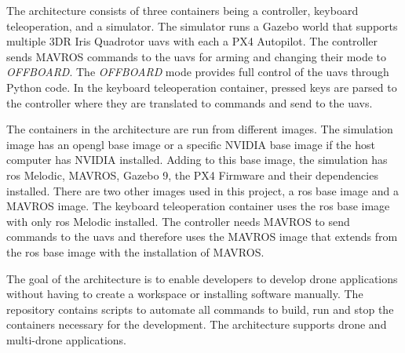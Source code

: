 The architecture consists of three containers being a controller, keyboard teleoperation, and a simulator. The simulator runs a Gazebo world that supports multiple 3DR Iris Quadrotor \acsp{uav} with each a PX4 Autopilot. The controller sends MAVROS commands to the \acsp{uav} for arming and changing their mode to \textit{OFFBOARD}. The \textit{OFFBOARD} mode provides full control of the \acsp{uav} through Python code. In the keyboard teleoperation container, pressed keys are parsed to the controller where they are translated to commands and send to the \acsp{uav}.

The containers in the architecture are run from different images. The simulation image has an \acs{opengl} base image or a specific NVIDIA base image if the host computer has NVIDIA installed. Adding to this base image, the simulation has \acs{ros} Melodic, MAVROS, Gazebo 9, the PX4 Firmware and their dependencies installed. There are two other images used in this project, a \acs{ros} base image and a MAVROS image. The keyboard teleoperation container uses the \acs{ros} base image with only \acs{ros} Melodic installed. The controller needs MAVROS to send commands to the \acsp{uav} and therefore uses the MAVROS image that extends from the \acs{ros} base image with the installation of MAVROS.

The goal of the architecture is to enable developers to develop drone applications without having to create a workspace or installing software manually. The repository contains scripts to automate all commands to build, run and stop the containers necessary for the development. The architecture supports drone and multi-drone applications.